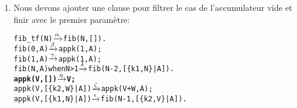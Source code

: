 \begin{enumerate}
  \item Nous devons ajouter une clause pour filtrer le cas de
    l'accumulateur vide et finir avec le premier paramètre:
\begin{alltt}
fib_tf(N)           \(\smashedrightarrow{\alpha}\) fib(N,[]).
fib(0,A)            \(\smashedrightarrow{\beta}\) appk(1,A);
fib(1,A)            \(\smashedrightarrow{\gamma}\) appk(1,A);
fib(N,A) when N > 1 \(\smashedrightarrow{\delta}\) fib(N-2,[\{k1,N\}|A]).
\textbf{appk(V,        [])  \(\smashedrightarrow{\eta}\) V;}\hfill% \emph{Attention!}
appk(V,[\{k2,W\}|A])  \(\smashedrightarrow{\zeta}\) appk(V+W,A);
appk(V,[\{k1,N\}|A])  \(\smashedrightarrow{\epsilon}\) fib(N-1,[\{k2,V\}|A]).
\end{alltt}


\end{enumerate}
